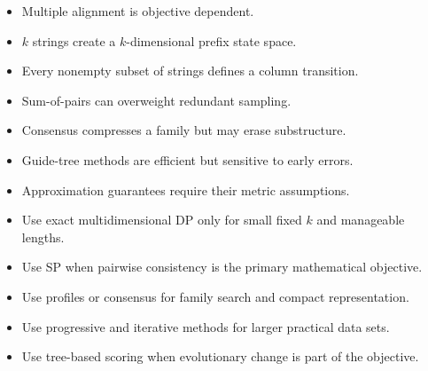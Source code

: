 \documentclass[11pt]{article}
\begin{document}
\begin{tcolorbox}[enhanced,breakable,title={Key takeaways},
  colback=white,colframe=Primary,fonttitle=\small\sffamily\bfseries,fontupper=\footnotesize,
  boxsep=0.6mm,left=1.5mm,right=1.5mm,top=1mm,bottom=1mm,before skip=3pt,after skip=3pt]
\begin{itemize}
  \item Multiple alignment is objective dependent.
  \item $k$ strings create a $k$-dimensional prefix state space.
  \item Every nonempty subset of strings defines a column transition.
  \item Sum-of-pairs can overweight redundant sampling.
  \item Consensus compresses a family but may erase substructure.
  \item Guide-tree methods are efficient but sensitive to early errors.
  \item Approximation guarantees require their metric assumptions.
\end{itemize}
\end{tcolorbox}

\begin{tcolorbox}[enhanced,breakable,title={Algorithm selection / when to use this},
  colback=Primary!3,colframe=Primary,fonttitle=\small\sffamily\bfseries,fontupper=\footnotesize,
  boxsep=0.6mm,left=1.5mm,right=1.5mm,top=1mm,bottom=1mm,before skip=3pt,after skip=3pt]
\begin{itemize}
  \item Use exact multidimensional DP only for small fixed $k$ and manageable lengths.
  \item Use SP when pairwise consistency is the primary mathematical objective.
  \item Use profiles or consensus for family search and compact representation.
  \item Use progressive and iterative methods for larger practical data sets.
  \item Use tree-based scoring when evolutionary change is part of the objective.
\end{itemize}
\end{tcolorbox}
\end{document}
